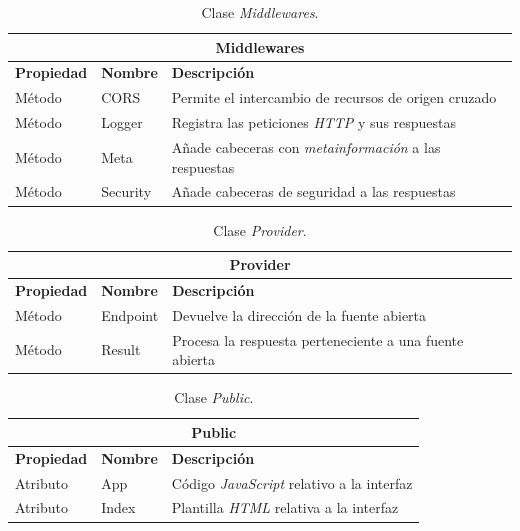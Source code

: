 \begin{table}[H]
    \begin{center}
        \begin{tabularx}{\textwidth}{| l | l | X |}
            \hline
            \multicolumn{3}{c}{ \textbf{Middlewares} } \\ \hline
            \textbf{Propiedad} & \textbf{Nombre} & \textbf{Descripción} \\ \hline
            Método & CORS & Permite el intercambio de recursos de origen cruzado \\ \hline
            Método & Logger & Registra las peticiones \textit{HTTP} y sus respuestas \\ \hline
            Método & Meta & Añade cabeceras con \textit{metainformación} a las respuestas \\ \hline
            Método & Security & Añade cabeceras de seguridad a las respuestas \\ \hline
        \end{tabularx}
    \end{center}
    \caption{Clase \textit{Middlewares}.}
    \label{tab:classMiddlewares}
\end{table}
\newpage
\begin{table}[H]
    \begin{center}
        \begin{tabularx}{\textwidth}{| l | l | X |}
            \hline
            \multicolumn{3}{c}{ \textbf{Provider} } \\ \hline
            \textbf{Propiedad} & \textbf{Nombre} & \textbf{Descripción} \\ \hline
            Método & Endpoint & Devuelve la dirección de la fuente abierta \\ \hline
            Método & Result & Procesa la respuesta perteneciente a una fuente abierta \\ \hline
        \end{tabularx}
    \end{center}
    \caption{Clase \textit{Provider}.}
    \label{tab:classProvider}
\end{table}

\begin{table}[H]
    \begin{center}
        \begin{tabularx}{\textwidth}{| l | l | X |}
            \hline
            \multicolumn{3}{c}{ \textbf{Public} } \\ \hline
            \textbf{Propiedad} & \textbf{Nombre} & \textbf{Descripción} \\ \hline
            Atributo & App & Código \textit{JavaScript} relativo a la interfaz \\ \hline
            Atributo & Index & Plantilla \textit{HTML} relativa a la interfaz \\ \hline
        \end{tabularx}
    \end{center}
    \caption{Clase \textit{Public}.}
    \label{tab:classPublic}
\end{table}

